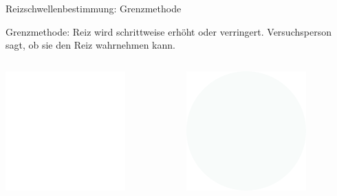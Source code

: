 \documentclass[aspectratio=169]{beamer}
\begin{document}
\begin{frame}{Reizschwellenbestimmung: Grenzmethode}


Grenzmethode: Reiz wird schrittweise erhöht oder verringert. Versuchsperson sagt, ob sie den Reiz wahrnehmen kann.
   

\begin{columns}[c]
\begin{column}{1cm}
\includegraphics[width=\textwidth]{reizschwelle_seriell_1.png}
\end{column}
\begin{column}{1cm}
\includegraphics[width=\textwidth]{reizschwelle_seriell_2.png}

\end{column}
\end{columns}
\end{frame}
\end{document}
